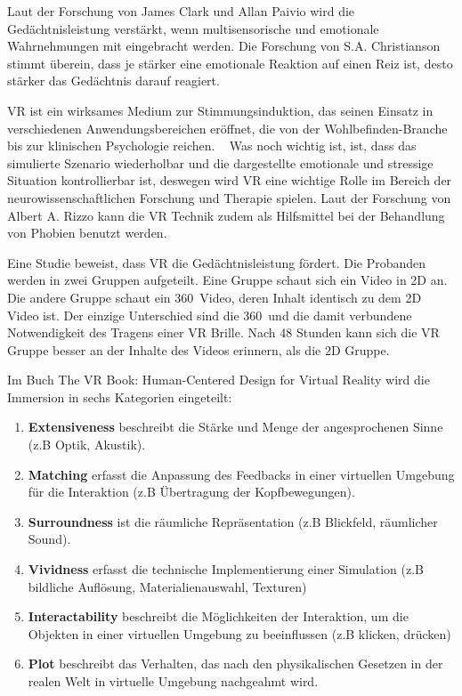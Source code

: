 Laut der Forschung von James Clark und Allan Paivio\citep{10} wird die Gedächtnisleistung verstärkt, wenn multisensorische und emotionale Wahrnehmungen mit eingebracht werden. Die Forschung von S.A. Christianson\citep{11} stimmt überein, dass je stärker eine emotionale Reaktion auf einen Reiz ist, desto stärker das Gedächtnis darauf reagiert. 

\glqq VR ist ein wirksames Medium zur Stimmungsinduktion, das seinen Einsatz in verschiedenen Anwendungsbereichen eröffnet, die von der Wohlbefinden-Branche bis zur klinischen Psychologie reichen. \grqq\ \citep{29} Was noch wichtig ist, ist, dass das simulierte Szenario wiederholbar und die dargestellte emotionale und stressige Situation kontrollierbar ist, deswegen wird VR eine wichtige Rolle im Bereich der neurowissenschaftlichen Forschung und Therapie spielen.\citep{13} Laut der Forschung von Albert A. Rizzo kann die VR Technik zudem als Hilfsmittel bei der Behandlung von Phobien benutzt werden.\citep{12}

Eine Studie\citep{30} beweist, dass VR die Gedächtnisleistung fördert. Die Probanden werden in zwei Gruppen aufgeteilt. Eine Gruppe schaut sich ein Video in 2D an. Die andere Gruppe schaut ein 360\degree\ Video, deren Inhalt identisch zu dem 2D Video ist. Der einzige Unterschied sind die 360\degree\ und die damit verbundene Notwendigkeit des Tragens einer VR Brille. Nach 48 Stunden kann sich die VR Gruppe besser an der Inhalte des Videos erinnern, als die 2D Gruppe.

Im Buch \glqq The VR Book: Human-Centered Design for Virtual Reality \grqq wird die Immersion in sechs Kategorien eingeteilt: \citep{28}

\begin{enumerate}
\item \textbf{Extensiveness} beschreibt die Stärke und Menge der angesprochenen Sinne (z.B Optik, Akustik).
\item \textbf{Matching} erfasst die Anpassung des Feedbacks in einer virtuellen Umgebung für die Interaktion (z.B Übertragung der Kopfbewegungen).
\item \textbf{Surroundness} ist die räumliche Repräsentation (z.B Blickfeld, räumlicher Sound).
\item \textbf{Vividness} erfasst die technische Implementierung einer Simulation (z.B bildliche Auflösung, Materialienauswahl, Texturen)
\item \textbf{Interactability} beschreibt die Möglichkeiten der Interaktion, um die Objekten in einer virtuellen Umgebung zu beeinflussen (z.B klicken, drücken)
\item \textbf{Plot} beschreibt das Verhalten, das nach den physikalischen Gesetzen in der realen Welt in virtuelle Umgebung nachgeahmt wird.
\end{enumerate}\

